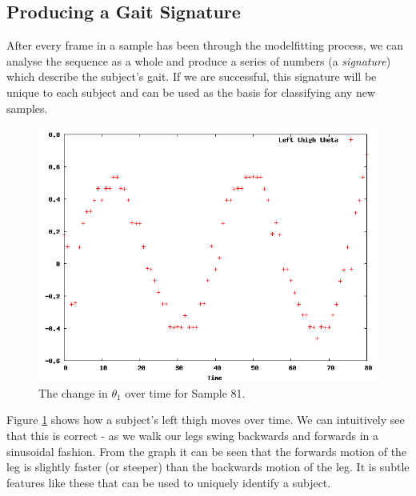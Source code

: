 \documentclass[a4paper,12pt]{article}
\begin{document}
\subsection{Producing a Gait Signature}

After every frame in a sample has been through the modelfitting process, we can analyse the sequence as a whole
and produce a series of numbers (a \emph{signature}) which describe the subject's gait.
If we are successful, this signature will be unique to each subject and can be used as the basis for classifying any new samples.

\begin{figure}[p]
	\centering
	\includegraphics[width=\textwidth]{../report/curvefitting.png}
	\caption{The change in $\theta_1$ over time for Sample 81.}
	\label{CurveFitting1}
\end{figure}

Figure \ref{CurveFitting1} shows how a subject's left thigh moves over time.
We can intuitively see that this is correct - as we walk our legs swing backwards and forwards in a sinusoidal fashion.
From the graph it can be seen that the forwards motion of the leg is slightly faster (or steeper) than the backwards motion of the leg.
It is subtle features like these that can be used to uniquely identify a subject.
\end{document}
